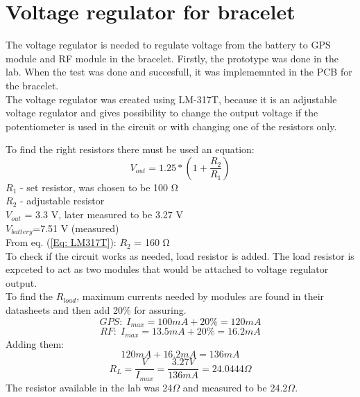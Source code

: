\onehalfspacing
\section{Voltage regulator for bracelet}
The voltage regulator is needed to regulate voltage from the battery to GPS module and RF module in the bracelet.
Firstly, the prototype was done in the lab. When the test was done and succesfull, it was implememnted in the PCB for the bracelet.\\
The voltage regulator was created using LM-317T, because it is an adjustable voltage regulator and gives possibility to 
change the output voltage if the potentiometer is used in the circuit or with changing one of the resistors only.  

To find the right resistors there must be used an equation: 
\begin{equation}\label{Eq: LM317T}
    V_{out}=1.25*(1+\frac{R_{2}}{R_{1}})
\end{equation}
$R_1$ - set resistor, was chosen to be 100 Ω \\
$R_2$ - adjustable resistor \\
$V_{out}$ = 3.3 V, later measured to be 3.27 V \\
$V_{battery}$=7.51 V (measured)\\
From eq. (\ref{Eq: LM317T}): $R_2$ = 160 Ω \\

To check if the circuit works as needed, load resistor is added. The load resistor is expceted to act as two modules that would 
be attached to voltage regulator output. \\
To find the $R_{load}$, maximum currents needed by modules are found in their datasheets and then add 20\% for assuring.\\
\[GPS:\; I_{max} = 100mA + 20\% = 120mA \]
\[RF:\; I_{max} = 13.5mA + 20\% = 16.2mA \]
Adding them:
\[120mA+16.2mA = 136mA\]
\[R_{L}=\frac{V}{I_{max}}=\frac{3.27V}{136mA} = 24.0444 \Omega\]
The resistor available in the lab was 24$\Omega$ and measured to be 24.2$\Omega$.\\
